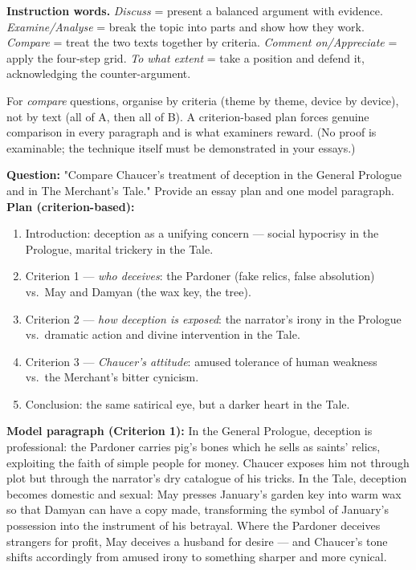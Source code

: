 \documentclass[11pt]{article}
\newcommand{\cle}[1]{{\popxbold\color{popdark}#1}}
\begin{document}
\textbf{Instruction words.} \emph{Discuss} = present a balanced argument with evidence. \emph{Examine/Analyse} = break the topic into parts and show how they work. \emph{Compare} = treat the two texts together by criteria. \emph{Comment on/Appreciate} = apply the four-step grid. \emph{To what extent} = take a position and defend it, acknowledging the counter-argument.

\begin{propriete}
For \emph{compare} questions, organise by \cle{criteria} (theme by theme, device by device), not by text (all of A, then all of B). A criterion-based plan forces genuine comparison in every paragraph and is what examiners reward. (No proof is examinable; the technique itself must be demonstrated in your essays.)
\end{propriete}

\begin{exoresolu}
\textbf{Question:} "Compare Chaucer's treatment of deception in the General Prologue and in The Merchant's Tale." Provide an essay plan and one model paragraph.
\tcblower
\textbf{Plan (criterion-based):}
\begin{enumerate}
\item Introduction: deception as a unifying concern — social hypocrisy in the Prologue, marital trickery in the Tale.
\item Criterion 1 — \emph{who deceives}: the Pardoner (fake relics, false absolution) vs.\ May and Damyan (the wax key, the tree).
\item Criterion 2 — \emph{how deception is exposed}: the narrator's irony in the Prologue vs.\ dramatic action and divine intervention in the Tale.
\item Criterion 3 — \emph{Chaucer's attitude}: amused tolerance of human weakness vs.\ the Merchant's bitter cynicism.
\item Conclusion: the same satirical eye, but a darker heart in the Tale.
\end{enumerate}
\textbf{Model paragraph (Criterion 1):} In the General Prologue, deception is professional: the Pardoner carries pig's bones which he sells as saints' relics, exploiting the faith of simple people for money. Chaucer exposes him not through plot but through the narrator's dry catalogue of his tricks. In the Tale, deception becomes domestic and sexual: May presses January's garden key into warm wax so that Damyan can have a copy made, transforming the symbol of January's possession into the instrument of his betrayal. Where the Pardoner deceives strangers for profit, May deceives a husband for desire — and Chaucer's tone shifts accordingly from amused irony to something sharper and more cynical.
\end{exoresolu}
\end{document}
